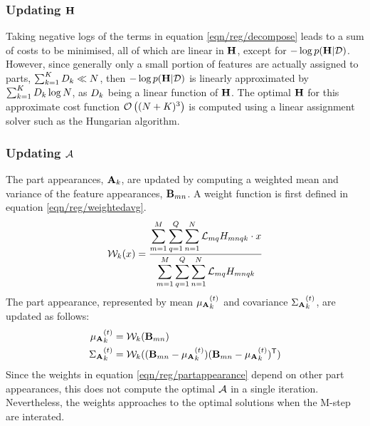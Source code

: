 \subsubsection{Updating $\mathbf{H}$}
Taking negative logs of the terms in equation \ref{eqn/reg/decompose} leads to a sum of costs to be minimised, all of which are linear in $\mathbf{H}$, except for $-\log p(\mathbf{H}|\mathcal{D})$. 
However, since generally only a small portion of features are actually assigned to parts, \ie $\sum_{k=1}^{K}{D}_k \ll N$, then $-\log p(\mathbf{H}|\mathcal{D})$ is linearly approximated by $\sum_{k=1}^{K}{D}_k\log N$,  as ${D}_k$ being a linear function of $\mathbf{H}$. The optimal $\mathbf{H}$ for this approximate cost function $\mathcal{O}\left((N + K)^3\right)$ is computed using a linear assignment solver such as the Hungarian algorithm.  

\subsubsection{Updating $\mathcal{A}$}
The part appearances, $\mathbf{A}_k$, are updated by computing a weighted mean and variance of the feature appearances, $\mathbf{B}_{mn}$. A weight function is first defined in equation \ref{eqn/reg/weightedavg}. 
\begin{equation}
	\mathcal{W}_k(x) = \frac{\displaystyle\sum_{m=1}^M \displaystyle\sum_{q = 1}^{Q} \displaystyle\sum_{n=1}^{N}\mathcal{L}_{mq}{H}_{mnqk} \cdot x}{\displaystyle\sum_{m=1}^M \displaystyle\sum_{q = 1}^{Q} \displaystyle\sum_{n=1}^{N}\mathcal{L}_{mq}{H}_{mnqk}}
	\label{eqn/reg/weightedavg} 
\end{equation}
The part appearance, represented by mean ${\mu_{\mathbf{A}}}_{k}^{(t)}$ and covariance ${\Sigma_{\mathbf{A}}}_{k}^{(t)}$, are updated as follows:  
\begin{equation}
	\begin{aligned}
		{\mu_{\mathbf{A}}}_{k}^{(t)} & = \mathcal{W}_k(\mathbf{B}_{mn}) \\  
		{\Sigma_{\mathbf{A}}}_{k}^{(t)} & = \mathcal{W}_k((\mathbf{B}_{mn} - {\mu_{\mathbf{A}}}_{k}^{(t)})(\mathbf{B}_{mn} - {\mu_{\mathbf{A}}}_{k}^{(t)})^{\textsf{T}})
	\end{aligned}
	\label{eqn/reg/partappearance}
\end{equation}
Since the weights in equation \ref{eqn/reg/partappearance} depend on other part appearances, this does not compute the optimal $\mathcal{A}$ in a single iteration. Nevertheless, the weights approaches to the optimal solutions when the M-step are interated. 

